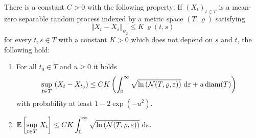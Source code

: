 \begin{theorem} \label{thm:dudleyyy}
There is a constant $C>0$ with the following property: If $(X_t)_{t \in T}$ is a mean-zero separable random process indexed by a metric space $(T,\varrho)$ satisfying
\begin{equation*}
\Vert X_t - X_s \Vert_{\psi_2} \leq K \, \varrho(t,s)
\end{equation*}
for every $t,s \in T$ with a constant $K>0$ which does not depend on $s$ and $t$, the following hold:
\begin{enumerate}
\item{For all $t_0 \in T$ and $u \geq 0$ it holds
\begin{equation*}
\underset{t \in T}{\sup} \ (X_t - X_{t_0}) \leq CK \left(\int_0^\infty \sqrt{\ln \left(\mathcal{N}(T, \varrho, \varepsilon)\right)} \ \mathrm{d}\varepsilon + u\operatorname{diam}(T)\right)
\end{equation*}
with probability at least $1- 2\exp(-u^2)$.}
\item{
$ \displaystyle
\EE \left[ \underset{t \in T}{\sup}\ X_t\right] \leq CK \int_0^\infty \sqrt{\ln \left(\mathcal{N}(T, \varrho, \eps)\right)} \ \dd\eps.
$}
\end{enumerate}
\end{theorem}

